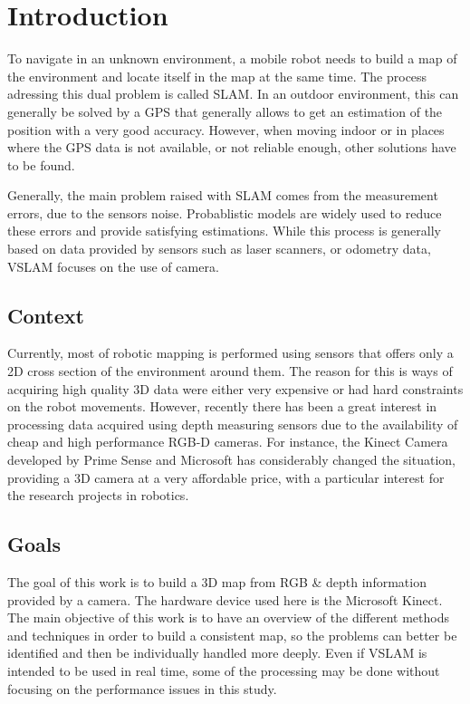 \chapter{Introduction}

To navigate in an unknown environment, a mobile robot needs to build a map of the environment and locate itself in the map at the same time. The process adressing this dual problem is called \gls{SLAM}. In an outdoor environment, this can generally be solved by a GPS that generally allows to get an estimation of the position with a very good accuracy. However, when moving indoor or in places where the GPS data is not available, or not reliable enough, other solutions have to be found. 

Generally, the main problem raised with \gls{SLAM} comes from the measurement errors, due to the sensors noise. Probablistic models are widely used to reduce these errors and provide satisfying estimations. While this process is generally based on data provided by sensors such as laser scanners, or odometry data, \gls{VSLAM} focuses on the use of camera. 

\section{Context}

Currently, most of robotic mapping is performed using sensors that offers only a 2D cross section of the environment around them. The reason for this is ways of acquiring high quality 3D data were either very expensive or had hard constraints on the robot movements. However, recently there has been a great interest in processing data acquired using depth measuring sensors due to the availability of cheap and high performance RGB-D cameras. For instance, the Kinect Camera developed by Prime Sense and Microsoft has considerably changed the situation, providing a 3D camera at a very affordable price, with a particular interest for the research projects in robotics.

\section{Goals}

The goal of this work is to build a 3D map from RGB \& depth information provided by a camera. The hardware device used here is the Microsoft Kinect. The main objective of this work is to have an overview of the different methods and techniques in order to build a consistent map, so the problems can better be identified and then be individually handled more deeply. Even if \gls{VSLAM} is intended to be used in real time, some of the processing may be done without focusing on the performance issues in this study. 

